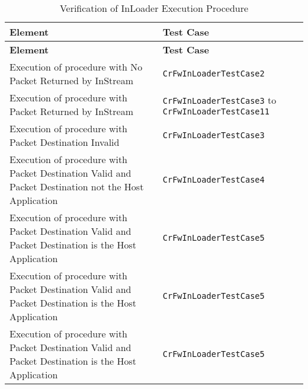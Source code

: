 \documentclass{pnp_article}
\begin{document}
\begin{longtable}{|>{\raggedright}p{8.0cm}|P{5.0cm}|}
\caption{Verification of InLoader Execution Procedure}
\label{tab:verInLoaderExecProc}\\
\hline
{}
\textbf{Element} & \textbf{Test Case} \\
\hline
\endfirsthead
{}
\textbf{Element} & \textbf{Test Case} \\
\hline
\endhead
Execution of procedure with No Packet Returned by InStream  & \texttt{CrFwInLoaderTestCase2}\\
\hline
Execution of procedure with Packet Returned by InStream  & \texttt{CrFwInLoaderTestCase3} to \texttt{CrFwInLoaderTestCase11}\\
\hline
Execution of procedure with Packet Destination Invalid  & \texttt{CrFwInLoaderTestCase3}\\
\hline
Execution of procedure with Packet Destination Valid and Packet Destination not the Host Application  & \texttt{CrFwInLoaderTestCase4}\\
\hline
Execution of procedure with Packet Destination Valid and Packet Destination is the Host Application  & \texttt{CrFwInLoaderTestCase5}\\
\hline
Execution of procedure with Packet Destination  Valid and Packet Destination is the Host Application  & \texttt{CrFwInLoaderTestCase5}\\
\hline
Execution of procedure with Packet Destination  Valid and Packet Destination is the Host Application  & \texttt{CrFwInLoaderTestCase5}\\
\hline
\end{longtable}
\end{document}
